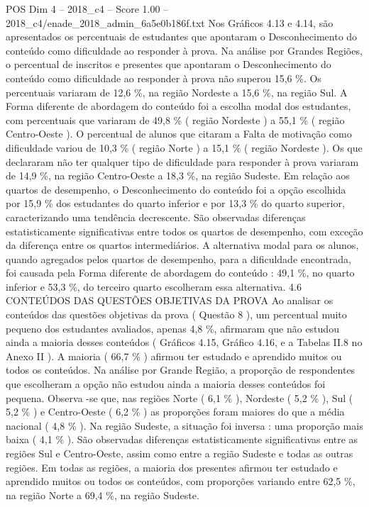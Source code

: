 \begin{textsample}{POS Dim 4 – 2018\_c4 – Score 1.00 – 2018\_c4/enade\_2018\_admin\_6a5e0b186f.txt}
Nos Gráficos 4.13 e 4.14, são apresentados os percentuais de estudantes que apontaram o Desconhecimento do conteúdo como dificuldade ao responder à prova.
Na análise por Grandes Regiões, o percentual de inscritos e presentes que apontaram o Desconhecimento do conteúdo como dificuldade ao responder à prova não superou 15,6 \%.
Os percentuais variaram de 12,6 \%, na região Nordeste a 15,6 \%, na região Sul.
A Forma diferente de abordagem do conteúdo foi a escolha modal dos estudantes, com percentuais que variaram de 49,8 \% ( região Nordeste ) a 55,1 \% ( região Centro-Oeste ).
O percentual de alunos que citaram a Falta de motivação como dificuldade variou de 10,3 \% ( região Norte ) a 15,1 \% ( região Nordeste ).
Os que declararam não ter qualquer tipo de dificuldade para responder à prova variaram de 14,9 \%, na região Centro-Oeste a 18,3 \%, na região Sudeste.
Em relação aos quartos de desempenho, o Desconhecimento do conteúdo foi a opção escolhida por 15,9 \% dos estudantes do quarto inferior e por 13,3 \% do quarto superior, caracterizando uma tendência decrescente.
São observadas diferenças estatisticamente significativas entre todos os quartos de desempenho, com exceção da diferença entre os quartos intermediários.
A alternativa modal para os alunos, quando agregados pelos quartos de desempenho, para a dificuldade encontrada, foi causada pela Forma diferente de abordagem do conteúdo : 49,1 \%, no quarto inferior e 53,3 \%, do terceiro quarto escolheram essa alternativa. 4.6 CONTEÚDOS DAS QUESTÕES OBJETIVAS DA PROVA Ao analisar os conteúdos das questões objetivas da prova ( Questão 8 ), um percentual muito pequeno dos estudantes avaliados, apenas 4,8 \%, afirmaram que não estudou ainda a maioria desses conteúdos ( Gráficos 4.15, Gráfico 4.16, e a Tabelas II.8 no Anexo II ).
A maioria ( 66,7 \% ) afirmou ter estudado e aprendido muitos ou todos os conteúdos.
Na análise por Grande Região, a proporção de respondentes que escolheram a opção não estudou ainda a maioria desses conteúdos foi pequena.
Observa -se que, nas regiões Norte ( 6,1 \% ), Nordeste ( 5,2 \% ), Sul ( 5,2 \% ) e Centro-Oeste ( 6,2 \% ) as proporções foram maiores do que a média nacional ( 4,8 \% ).
Na região Sudeste, a situação foi inversa : uma proporção mais baixa ( 4,1 \% ).
São observadas diferenças estatisticamente significativas entre as regiões Sul e Centro-Oeste, assim como entre a região Sudeste e todas as outras regiões.
Em todas as regiões, a maioria dos presentes afirmou ter estudado e aprendido muitos ou todos os conteúdos, com proporções variando entre 62,5 \%, na região Norte a 69,4 \%, na região Sudeste.

\end{textsample}

